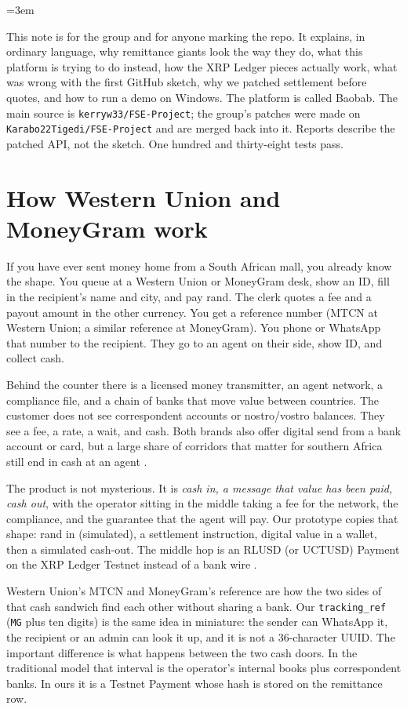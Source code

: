 \documentclass[11pt]{article}
\begin{document}
\emergencystretch=3em

\noindent
This note is for the group and for anyone marking the repo. It explains, in ordinary language, why remittance giants look the way they do, what this platform is trying to do instead, how the XRP Ledger pieces actually work, what was wrong with the first GitHub sketch, why we patched settlement before quotes, and how to run a demo on Windows. The platform is called Baobab. The main source is \texttt{kerryw33/FSE-Project}; the group's patches were made on \texttt{Karabo22Tigedi/FSE-Project} and are merged back into it. Reports describe the patched API, not the sketch. One hundred and thirty-eight tests pass.

\section{How Western Union and MoneyGram work}
If you have ever sent money home from a South African mall, you already know the shape. You queue at a Western Union or MoneyGram desk, show an ID, fill in the recipient's name and city, and pay rand. The clerk quotes a fee and a payout amount in the other currency. You get a reference number (MTCN at Western Union; a similar reference at MoneyGram). You phone or WhatsApp that number to the recipient. They go to an agent on their side, show ID, and collect cash.

Behind the counter there is a licensed money transmitter, an agent network, a compliance file, and a chain of banks that move value between countries. The customer does not see correspondent accounts or nostro/vostro balances. They see a fee, a rate, a wait, and cash. Both brands also offer digital send from a bank account or card, but a large share of corridors that matter for southern Africa still end in cash at an agent \citep{IMF2025SAZim,FinMark2024}.

The product is not mysterious. It is \emph{cash in, a message that value has been paid, cash out}, with the operator sitting in the middle taking a fee for the network, the compliance, and the guarantee that the agent will pay. Our prototype copies that shape: rand in (simulated), a settlement instruction, digital value in a wallet, then a simulated cash-out. The middle hop is an RLUSD (or UCTUSD) Payment on the XRP Ledger Testnet instead of a bank wire \citep{UCTBrief2026}.

Western Union's MTCN and MoneyGram's reference are how the two sides of that cash sandwich find each other without sharing a bank. Our \texttt{tracking\_ref} (\texttt{MG} plus ten digits) is the same idea in miniature: the sender can WhatsApp it, the recipient or an admin can look it up, and it is not a 36-character UUID. The important difference is what happens between the two cash doors. In the traditional model that interval is the operator's internal books plus correspondent banks. In ours it is a Testnet Payment whose hash is stored on the remittance row.
\end{document}
